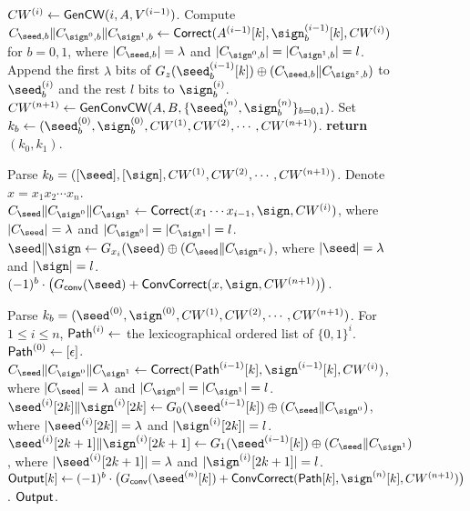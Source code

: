 \begin{figure*}
{{\begin{algorithmic}[1]
        \EndIf
      \EndFor
      \State $CW^{(i)}\gets {\sf GenCW}(i,A,V^{(i-1)})$. \label{alg:paradigm_gen_cw}
          \State Compute $C_{\seed,b}\|C_{\sign^0,b}\|C_{\sign^1,b}\gets {\sf Correct}(A^{(i-1)}[k], \sign_b^{(i-1)}[k], CW^{(i)})$ for $b=0,1$, where $|C_{\seed,b}| = \lambda$ and $|C_{\sign^0,b}| = |C_{\sign^1,b}| = l$. 
          \State Append the first $\lambda$ bits of $G_z(\seed_b^{(i-1)}[k])\oplus(C_{\seed,b}\|C_{\sign^z,b})$ to $\seed_b^{(i)}$ and the rest $l$ bits to $\sign_b^{(i)}$. 
          \EndIf
        \EndFor
      \EndFor
      \State $CW^{(n+1)}\gets{\sf GenConvCW}(A,B,\{\seed_b^{(n)},\sign_b^{(n)}\}_{b=0,1})$. \label{alg:paradigm_gen_convert_cw}
      \State Set $k_b \gets (\seed_b^{(0)},\sign_b^{(0)}, CW^{(1)},CW^{(2)},\cdots,CW^{(n+1)})$.
      \State \textbf{return} $(k_0,k_1)$.
      \EndProcedure
      \item[]
      \State Parse $k_b = ([\seed],[\sign],CW^{(1)},CW^{(2)},\cdots,CW^{(n+1)})$. 
      \State Denote $x=x_1x_2\cdots x_n$. 
        \State $C_\seed\|C_{\sign^0}\|C_{\sign^1}\gets {\sf Correct}(x_1\cdots x_{i-1},\sign,CW^{(i)})$, where $|C_\seed| = \lambda$ and $|C_{\sign^0}| = |C_{\sign^1}| = l$. \label{alg:paradigm_correction}
        \State $\seed\|\sign\gets G_{x_i}(\seed)\oplus(C_{\seed}\|C_{\sign^{x_i}})$, where $|\seed|=\lambda$ and $|\sign|=l$. \label{alg:paradigm_seed_sign}
      \EndFor
      \State \Return $(-1)^b\cdot \big(G_{\sf conv}(\seed)+{\sf ConvCorrect}(x,\sign,CW^{(n+1)})\big)$. \label{alg:paradigm_convert_correction}
      \EndProcedure
      \item[]
      \State Parse $k_b=(\seed^{(0)},\sign^{(0)},CW^{(1)},CW^{(2)},\cdots,CW^{(n+1)})$. 
      \State For $1\le i\le n$, ${\sf Path}^{(i)}\gets$ the lexicographical ordered list of $\{0,1\}^i$. ${\sf Path}^{(0)}\gets[\epsilon]$. 
      \State{}
          \State $C_\seed\|C_{\sign^0}\|C_{\sign^1}\gets {\sf Correct}({\sf Path}^{(i-1)}[k],\sign^{(i-1)}[k],CW^{(i)})$, where $|C_\seed| = \lambda$ and $|C_{\sign^0}| = |C_{\sign^1}| = l$. 
          \State $\seed^{(i)}[2k]\|\sign^{(i)}[2k]\gets G_0(\seed^{(i-1)}[k])\oplus (C_\seed\|C_{\sign^0})$, where $|\seed^{(i)}[2k]|=\lambda$ and $|\sign^{(i)}[2k]|=l$. 
          \State $\seed^{(i)}[2k+1]\|\sign^{(i)}[2k+1]\gets G_1(\seed^{(i-1)}[k])\oplus (C_\seed\|C_{\sign^1})$, where $|\seed^{(i)}[2k+1]|=\lambda$ and $|\sign^{(i)}[2k+1]|=l$. 
        \EndFor
      \EndFor
        \State ${\sf Output}[k]\gets (-1)^b\cdot \big(G_{\sf conv}(\seed^{(n)}[k])+{\sf ConvCorrect}({\sf Path}[k],\sign^{(n)}[k],CW^{(n+1)})\big)$.
      \EndFor
      \State\Return $\sf Output$. 
      \EndProcedure
      \end{algorithmic}}}
  \end{figure*}